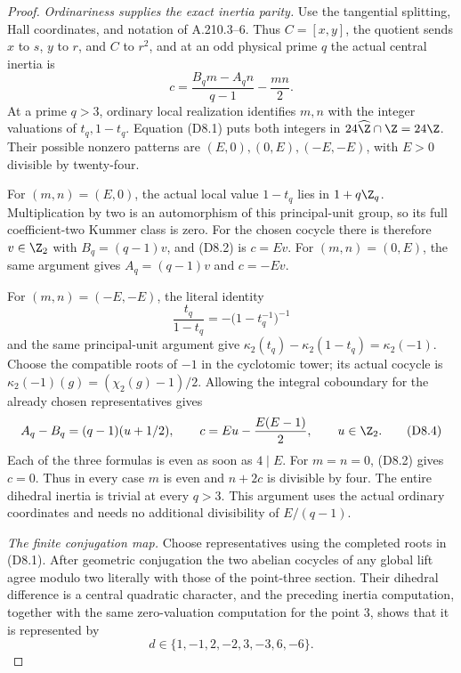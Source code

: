 \begin{proof}
\emph{Ordinariness supplies the exact inertia parity.}
Use the tangential splitting, Hall coordinates, and notation
of A.210.3--6.  Thus \(C=[x,y]\), the quotient sends
\(x\) to \(s\), \(y\) to \(r\), and \(C\) to \(r^2\), and
at an odd physical prime \(q\) the actual central inertia is
\[
                  c=\frac{B_qm-A_qn}{q-1}-\frac{mn}{2}.
\tag{D8.2}
\]
At a prime \(q>3\), ordinary local realization identifies
\(m,n\) with the integer valuations of \(t_q,1-t_q\).
Equation (D8.1) puts both integers in
\(24\widehat\Z\cap\Z=24\Z\).  Their possible nonzero
patterns are \((E,0),(0,E),(-E,-E)\), with
\(E>0\) divisible by twenty-four.

For \((m,n)=(E,0)\), the actual local value
\(1-t_q\) lies in \(1+q\Z_q\).  Multiplication by two
is an automorphism of this principal-unit group, so its
full coefficient-two Kummer class is zero.  For the
chosen cocycle there is therefore \(v\in\Z_2\) with
\(B_q=(q-1)v\), and (D8.2) is \(c=Ev\).
For \((m,n)=(0,E)\), the same argument gives
\(A_q=(q-1)v\) and \(c=-Ev\).

For \((m,n)=(-E,-E)\), the literal identity
\[
            \frac{t_q}{1-t_q}
                   =-\bigl(1-t_q^{-1}\bigr)^{-1}
\tag{D8.3}
\]
and the same principal-unit argument give
\(\kappa_2(t_q)-\kappa_2(1-t_q)=\kappa_2(-1)\).
Choose the compatible roots of \(-1\) in the cyclotomic
tower; its actual cocycle is
\(\kappa_2(-1)(g)=(\chi_2(g)-1)/2\).
Allowing the integral coboundary for the already chosen
representatives gives
\[
 A_q-B_q=(q-1)(u+1/2),\qquad
 c=Eu-\frac{E(E-1)}2,\qquad u\in\Z_2.
\tag{D8.4}
\]
Each of the three formulas is even as soon as \(4\mid E\).
For \(m=n=0\), (D8.2) gives \(c=0\).
Thus in every case \(m\) is even and \(n+2c\) is
divisible by four.  The entire dihedral inertia is trivial
at every \(q>3\).  This argument uses the actual ordinary
coordinates and needs no additional divisibility of
\(E/(q-1)\).

\emph{The finite conjugation map.}
Choose representatives using the completed roots in
(D8.1).  After geometric conjugation the two abelian
cocycles of any global lift agree modulo two literally
with those of the point-three section.  Their dihedral
difference is a central quadratic character, and the
preceding inertia computation, together with the same
zero-valuation computation for the point \(3\), shows
that it is represented by
\[
                   d\in\{1,-1,2,-2,3,-3,6,-6\}.
\tag{D8.5}
\]


\end{proof}
